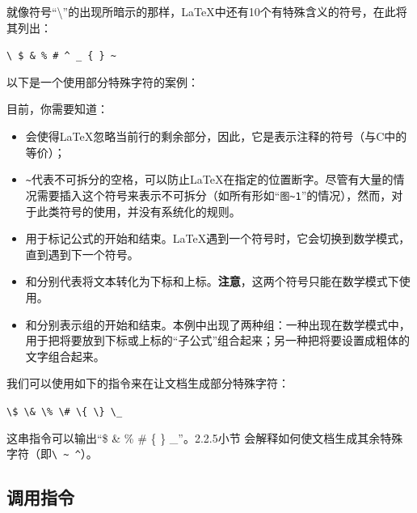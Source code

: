 就像符号“\backslash”的出现所暗示的那样，\LaTeX 中还有10个有特殊含义的符号，在此将其列出：

\begin{dmd}
    \verb+\ $ & % # ^ _ { } ~+
\end{dmd}


以下是一个使用部分特殊字符的案例：


目前，你需要知道：

\begin{itemize}
    \item \dm{\%}会使得\LaTeX 忽略当前行的剩余部分，因此，它是表示注释的符号（与C中的\dm{//}等价）；
    \item \verb+~+代表不可拆分的空格，可以防止\LaTeX 在指定的位置断字。尽管有大量的情况需要插入这个符号来表示不可拆分（如所有形如“\verb+图~1+”的情况），然而，对于此类符号的使用，并没有系统化的规则。
    \item \dm{\$}用于标记公式的开始和结束。\LaTeX 遇到一个\dm{\$}符号时，它会切换到数学模式，直到遇到下一个\dm{\$}符号。
    \item \dm{\_}和\dm{\^{}}分别代表将文本转化为下标和上标。\textbf{注意}，这两个符号只能在数学模式下使用。
    \item \dm{\{}和\dm{\}}分别表示组的开始和结束。本例中出现了两种组：一种出现在数学模式中，用于把将要放到下标或上标的“子公式”组合起来；另一种把将要设置成粗体的文字组合起来。
\end{itemize}

我们可以使用如下的指令来在让文档生成部分特殊字符：

\begin{dmd}
    \verb+\$ \& \% \# \{ \} \_+
\end{dmd}

这串指令可以输出“\$ \& \% \# \{ \} \_”。2.2.5小节%
会解释如何使文档生成其余特殊字符（即\verb+\ ~ ^+）。

\subsection{调用指令}

